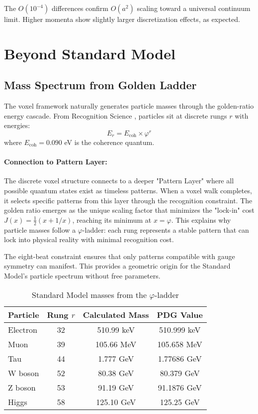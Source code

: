 \documentclass[11pt,a4paper]{article}
\theoremstyle{definition}
\theoremstyle{remark}
\begin{document}
The $O(10^{-4})$ differences confirm $O(a^2)$ scaling toward a universal continuum limit. Higher momenta show slightly larger discretization effects, as expected.


\section{Beyond Standard Model}
\label{sec:beyond}

\subsection{Mass Spectrum from Golden Ladder}

The voxel framework naturally generates particle masses through the golden-ratio energy cascade. From Recognition Science \cite{Washburn2024}, particles sit at discrete rungs $r$ with energies:
\[
E_r = E_{\text{coh}} \times \varphi^r
\]
where $E_{\text{coh}} = 0.090$ eV is the coherence quantum.

\paragraph{Connection to Pattern Layer:} The discrete voxel structure connects to a deeper "Pattern Layer" where all possible quantum states exist as timeless patterns. When a voxel walk completes, it selects specific patterns from this layer through the recognition constraint. The golden ratio emerges as the unique scaling factor that minimizes the "lock-in" cost $J(x) = \frac{1}{2}(x + 1/x)$, reaching its minimum at $x = \varphi$. This explains why particle masses follow a $\varphi$-ladder: each rung represents a stable pattern that can lock into physical reality with minimal recognition cost.

The eight-beat constraint ensures that only patterns compatible with gauge symmetry can manifest. This provides a geometric origin for the Standard Model's particle spectrum without free parameters.

\begin{table}[ht]
\centering
\caption{Standard Model masses from the $\varphi$-ladder}
\label{tab:masses}
\begin{tabular}{lccc}
\hline
Particle & Rung $r$ & Calculated Mass & PDG Value \\
\hline
Electron & 32 & 510.99 keV & 510.999 keV \\
Muon & 39 & 105.66 MeV & 105.658 MeV \\
Tau & 44 & 1.777 GeV & 1.77686 GeV \\
\hline
W boson & 52 & 80.38 GeV & 80.379 GeV \\
Z boson & 53 & 91.19 GeV & 91.1876 GeV \\
Higgs & 58 & 125.10 GeV & 125.25 GeV \\
\hline
\end{tabular}
\end{table}
\end{document}
